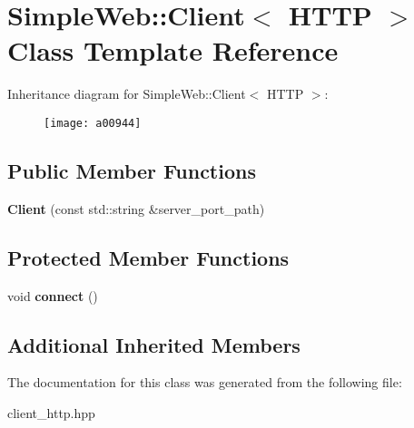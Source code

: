\hypertarget{a00944}{}\section{Simple\+Web\+:\+:Client$<$ H\+T\+TP $>$ Class Template Reference}
\label{a00944}
Inheritance diagram for Simple\+Web\+:\+:Client$<$ H\+T\+TP $>$\+:\begin{figure}[H]
\begin{center}
\leavevmode
\texttt{[image: a00944]}
\end{center}
\end{figure}
\subsection*{Public Member Functions}
\begin{DoxyCompactItemize}
\item 
\mbox{\label{a00944_a47655afc849e459096743876391dae17}} 
{\bfseries Client} (const std\+::string \&server\+\_\+port\+\_\+path)
\end{DoxyCompactItemize}
\subsection*{Protected Member Functions}
\begin{DoxyCompactItemize}
\item 
\mbox{\label{a00944_aebed110274c94b539e2d0a857c24991d}} 
void {\bfseries connect} ()
\end{DoxyCompactItemize}
\subsection*{Additional Inherited Members}


The documentation for this class was generated from the following file\+:\begin{DoxyCompactItemize}
\item 
client\+\_\+http.\+hpp\end{DoxyCompactItemize}
